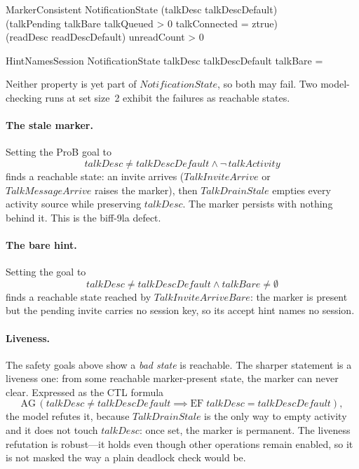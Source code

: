 \documentclass[a4paper,10pt,fleqn]{article}
\begin{document}
\begin{schema}{MarkerConsistent}
  NotificationState
  \where
  (talkDesc \neq talkDescDefault) \iff \\
  \quad (\dom talkPending \neq \emptyset \lor talkBare \neq \emptyset \lor
  talkQueued > 0 \lor talkConnected = ztrue) \\
  (readDesc \neq readDescDefault) \iff unreadCount > 0
\end{schema}

\begin{schema}{HintNamesSession}
  NotificationState
  \where
  talkDesc \neq talkDescDefault \implies talkBare = \emptyset
\end{schema}

Neither property is yet part of $NotificationState$, so both may fail.
Two model-checking runs at set size~2 exhibit the failures as reachable
states.

\paragraph{The stale marker.}  Setting the ProB goal to
\[
  talkDesc \neq talkDescDefault \land \lnot\, talkActivity
\]
finds a reachable state: an invite arrives ($TalkInviteArrive$ or
$TalkMessageArrive$ raises the marker), then $TalkDrainStale$ empties
every activity source while preserving $talkDesc$.  The marker persists
with nothing behind it.  This is the biff-9la defect.

\paragraph{The bare hint.}  Setting the goal to
\[
  talkDesc \neq talkDescDefault \land talkBare \neq \emptyset
\]
finds a reachable state reached by $TalkInviteArriveBare$: the marker is
present but the pending invite carries no session key, so its accept hint
names no session.

\paragraph{Liveness.}  The safety goals above show a \emph{bad state} is
reachable.  The sharper statement is a liveness one: from some reachable
marker-present state, the marker can never clear.  Expressed as the CTL
formula
\[
  \mathrm{AG}\,(talkDesc \neq talkDescDefault \implies
    \mathrm{EF}\;talkDesc = talkDescDefault),
\]
the model refutes it, because $TalkDrainStale$ is the only way to empty
activity and it does not touch $talkDesc$: once set, the marker is
permanent.  The liveness refutation is robust---it holds even though
other operations remain enabled, so it is not masked the way a plain
deadlock check would be.
\end{document}
